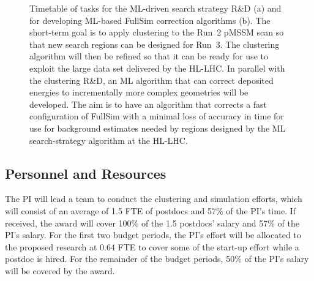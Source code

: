 \documentclass[letter, USenglish, 11pt, subfigure]{article}
\begin{document}
\begin{figure}[!htbp]
  \centering
  \caption{Timetable of tasks for the ML-driven search strategy R\&D (a) and for developing ML-based FullSim correction algorithms (b). The short-term goal is to apply clustering to the Run~2 pMSSM scan so that new search regions can be designed for Run~3. The clustering algorithm will then be refined so that it can be ready for use to exploit the large data set delivered by the HL-LHC.
    In parallel with the clustering R\&D, an ML algorithm that can correct deposited energies to incrementally more complex geometries will be developed. The aim is to have an algorithm that corrects a fast configuration of FullSim with a minimal loss of accuracy in time for use for background estimates needed by regions designed by the ML search-strategy algorithm at the HL-LHC.
  }
  \label{fig:timetable}
\end{figure}


\subsection{Personnel and Resources}
\label{sec:personnel}
The PI will lead a team to conduct the clustering and simulation efforts, which will consist of an average of 1.5 FTE of postdocs and 57\% of the PI's time. If received, the award will cover 100\% of the 1.5 postdocs' salary and 57\% of the PI's salary. For the first two budget periods, the PI's effort will be allocated to the proposed research at 0.64 FTE to cover some of the start-up effort while a postdoc is hired. For the remainder of the budget periods, 50\% of the PI's salary will be covered by the award.
\end{document}
